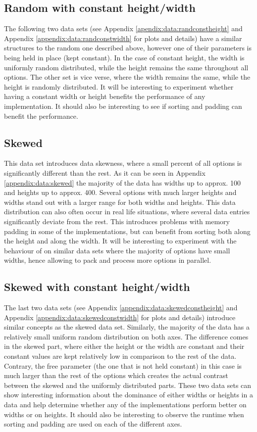 \subsection{Random with constant height/width}
The following two data sets (see Appendix \ref{apendix:data:randconstheight} and Appendix \ref{appendix:data:randconstwidth} for plots and details) have a similar structures to the random one described above, however one of their parameters is being held in place (kept constant). In the case of constant height, the width is uniformly random distributed, while the height remains the same throughout all options. The other set is vice verse, where the width remains the same, while the height is randomly distributed. It will be interesting to experiment whether having a constant width or height benefits the performance of any implementation. It should also be interesting to see if sorting and padding can benefit the performance. 

\subsection{Skewed}
This data set introduces data skewness, where a small percent of all options is significantly different than the rest. As it can be seen in Appendix \ref{appendix:data:skewed} the majority of the data has widths up to approx. 100 and heights up to approx. 400. Several options with much larger heights and widths stand out with a larger range for both widths and heights. This data distribution can also often occur in real life situations, where several data entries significantly deviate from the rest. This introduces problems with memory padding in some of the implementations, but can benefit from sorting both along the height and along the width. It will be interesting to experiment with the behaviour of  on similar data sets where the majority of options have small widths, hence allowing to pack and process more options in parallel. 

\subsection{Skewed with constant height/width}
The last two data sets (see Appendix \ref{appendix:data:skewedconstheight} and Appendix \ref{appendix:data:skewedconstwidth} for plots and details) introduce similar concepts as the skewed data set. Similarly, the majority of the data has a relatively small uniform random distribution on both axes. The difference comes in the skewed part, where either the height or the width are constant and their constant values are kept relatively low in comparison to the rest of the data. Contrary, the free parameter (the one that is not held constant) in this case is much larger than the rest of the options which creates the actual contrast between the skewed and the uniformly distributed parts. These two data sets can show interesting information about the dominance of either widths or heights in a data and help determine whether any of the implementations perform better on widths or on heights. It should also be interesting to observe the runtime when sorting and padding are used on each of the different axes. 

